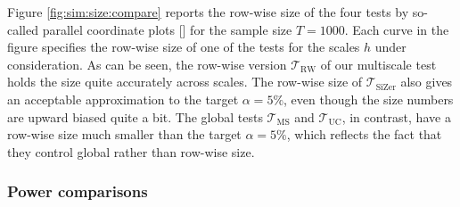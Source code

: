 Figure \ref{fig:sim:size:compare} reports the row-wise size of the four tests by so-called parallel coordinate plots [\cite{Inselberg1985}] for the sample size $T=1000$. Each curve in the figure specifies the row-wise size of one of the tests for the scales $h$ under consideration. As can be seen, the row-wise version $\mathcal{T}_{\text{RW}}$ of our multiscale test holds the size quite accurately across scales. %
The row-wise size of $\mathcal{T}_{\text{SiZer}}$ also gives an acceptable approximation to the target $\alpha=5\%$, even though the size numbers are upward biased quite a bit. The global tests $\mathcal{T}_{\text{MS}}$ and $\mathcal{T}_{\text{UC}}$, in contrast, have a row-wise size much smaller than the target $\alpha=5\%$, which reflects the fact that they control global rather than row-wise size. 


\subsubsection{Power comparisons}


